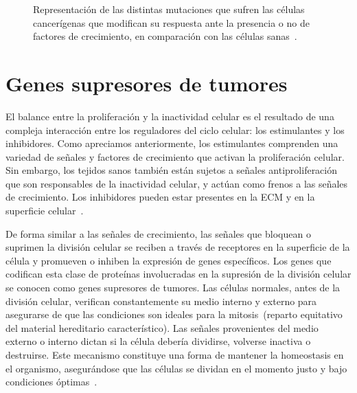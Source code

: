 \begin{figure}[!ht]
\begin{center}
\end{center}\vspace*{-0.6cm}
\caption[Representaci\'on de las distintas mutaciones que sufren las c\'elulas cancer\'igenas que modifican su respuesta ante la presencia o no de factores de crecimiento, en comparaci\'on con las c\'elulas sanas]{Representaci\'on de las distintas mutaciones que sufren las c\'elulas cancer\'igenas que modifican su respuesta ante la presencia o no de factores de crecimiento, en comparaci\'on con las c\'elulas sanas~\cite{robins}.}
\label{fig-growth-factor}
\end{figure}

\section{Genes supresores de tumores}
\label{subsec-supp-genes}
El balance entre la proliferaci\'on y la inactividad celular es el resultado de una compleja interacci\'on entre los reguladores del ciclo celular: los estimulantes y los inhibidores. Como apreciamos anteriormente, los estimulantes comprenden una variedad de se\~nales y factores de crecimiento que activan la proliferaci\'on celular. Sin embargo, los tejidos sanos tambi\'en est\'an sujetos a se\~nales antiproliferaci\'on que son responsables de la inactividad celular, y act\'uan como frenos a las se\~nales de crecimiento. Los inhibidores pueden estar presentes en la ECM y en la superficie celular~\cite{robins,hanahan,cancerbook}. 

De forma similar a las se\~nales de crecimiento, las se\~nales que bloquean o suprimen la divisi\'on celular se reciben a trav\'es de receptores en la superficie de la c\'elula y promueven o inhiben la expresi\'on de genes espec\'ificos. Los genes que codifican esta clase de prote\'inas involucradas en la supresi\'on de la divisi\'on celular se conocen como genes supresores de tumores. Las c\'elulas normales, antes de la divisi\'on celular, verifican constantemente su medio interno y externo para asegurarse de que las condiciones son ideales para la mitosis~(reparto equitativo del material hereditario caracter\'istico). Las se\~nales provenientes del medio externo o interno dictan si la c\'elula deber\'ia dividirse, volverse inactiva o destruirse. Este mecanismo constituye una forma de mantener la homeostasis en el organismo, asegur\'andose que las c\'elulas se dividan en el momento justo y bajo condiciones \'optimas~\cite{robins,hanahan,cancerbook}.

